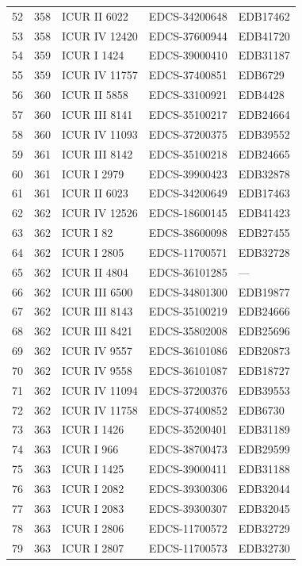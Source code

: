 \begin{longtable}{@{}r r l l l@{}}
52 & 358 & ICUR II 6022 & EDCS-34200648 & EDB17462 \\
53 & 358 & ICUR IV 12420 & EDCS-37600944 & EDB41720 \\
54 & 359 & ICUR I 1424 & EDCS-39000410 & EDB31187 \\
55 & 359 & ICUR IV 11757 & EDCS-37400851 & EDB6729 \\
56 & 360 & ICUR II 5858 & EDCS-33100921 & EDB4428 \\
57 & 360 & ICUR III 8141 & EDCS-35100217 & EDB24664 \\
58 & 360 & ICUR IV 11093 & EDCS-37200375 & EDB39552 \\
59 & 361 & ICUR III 8142 & EDCS-35100218 & EDB24665 \\
60 & 361 & ICUR I 2979 & EDCS-39900423 & EDB32878 \\
61 & 361 & ICUR II 6023 & EDCS-34200649 & EDB17463 \\
62 & 362 & ICUR IV 12526 & EDCS-18600145 & EDB41423 \\
63 & 362 & ICUR I 82 & EDCS-38600098 & EDB27455 \\
64 & 362 & ICUR I 2805 & EDCS-11700571 & EDB32728 \\
65 & 362 & ICUR II 4804 & EDCS-36101285 & — \\
66 & 362 & ICUR III 6500 & EDCS-34801300 & EDB19877 \\
67 & 362 & ICUR III 8143 & EDCS-35100219 & EDB24666 \\
68 & 362 & ICUR III 8421 & EDCS-35802008 & EDB25696 \\
69 & 362 & ICUR IV 9557 & EDCS-36101086 & EDB20873 \\
70 & 362 & ICUR IV 9558 & EDCS-36101087 & EDB18727 \\
71 & 362 & ICUR IV 11094 & EDCS-37200376 & EDB39553 \\
72 & 362 & ICUR IV 11758 & EDCS-37400852 & EDB6730 \\
73 & 363 & ICUR I 1426 & EDCS-35200401 & EDB31189 \\
74 & 363 & ICUR I 966 & EDCS-38700473 & EDB29599 \\
75 & 363 & ICUR I 1425 & EDCS-39000411 & EDB31188 \\
76 & 363 & ICUR I 2082 & EDCS-39300306 & EDB32044 \\
77 & 363 & ICUR I 2083 & EDCS-39300307 & EDB32045 \\
78 & 363 & ICUR I 2806 & EDCS-11700572 & EDB32729 \\
79 & 363 & ICUR I 2807 & EDCS-11700573 & EDB32730 \\

\end{longtable}
